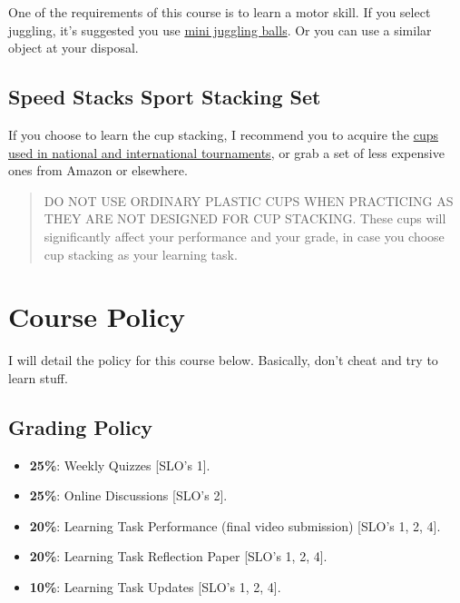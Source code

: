 \documentclass[11pt,]{article}
\begin{document}
One of the requirements of this course is to learn a motor skill. If you
select juggling, it's suggested you use \href{http://goo.gl/X3EjLE}{mini
juggling balls}. Or you can use a similar object at your disposal.

\hypertarget{speed-stacks-sport-stacking-set}{%
\subsection{Speed Stacks Sport Stacking
Set}\label{speed-stacks-sport-stacking-set}}

If you choose to learn the cup stacking, I recommend you to acquire the
\href{http://goo.gl/Y8HXt5}{cups used in national and international
tournaments}, or grab a set of less expensive ones from Amazon or
elsewhere.

\begin{quote}
DO NOT USE ORDINARY PLASTIC CUPS WHEN PRACTICING AS THEY ARE NOT
DESIGNED FOR CUP STACKING. These cups will significantly affect your
performance and your grade, in case you choose cup stacking as your
learning task.
\end{quote}

\hypertarget{course-policy}{%
\section{Course Policy}\label{course-policy}}

I will detail the policy for this course below. Basically, don't cheat
and try to learn stuff.

\hypertarget{grading-policy}{%
\subsection{Grading Policy}\label{grading-policy}}

\begin{itemize}
\item
  \textbf{25\%}: Weekly Quizzes {[}SLO's 1{]}.
\item
  \textbf{25\%}: Online Discussions {[}SLO's 2{]}.
\item
  \textbf{20\%}: Learning Task Performance (final video submission)
  {[}SLO's 1, 2, 4{]}.
\item
  \textbf{20\%}: Learning Task Reflection Paper {[}SLO's 1, 2, 4{]}.
\item
  \textbf{10\%}: Learning Task Updates {[}SLO's 1, 2, 4{]}.
\end{itemize}
\end{document}

